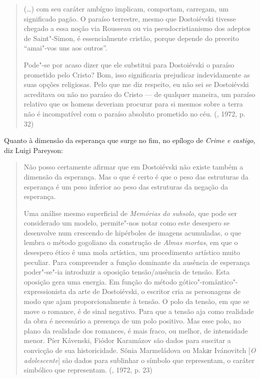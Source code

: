 \begin{quote}
(\ldots{}) com seu caráter ambíguo implicam, comportam, carregam, um
significado pagão. O paraíso terrestre, mesmo que Dostoiévski tivesse
chegado a essa noção via Rousseau ou via pseudocristianismo dos adeptos
de Saint"-Simon, é essencialmente cristão, porque depende do preceito
``amai"-vos uns aos outros''.

Pode"-se por acaso dizer que ele substitui para Dostoiévski o paraíso
prometido pelo Cristo? Bom, isso significaria prejudicar indevidamente
as suas opções religiosas. Pelo que me diz respeito, eu não sei se
Dostoiévski acreditava ou não no paraíso do Cristo --- de qualquer
maneira, um paraíso relativo que os homens deveriam procurar para si
mesmos sobre a terra não é incompatível com o paraíso absoluto prometido
no céu. (, 1972, p. 32)
\end{quote}

Quanto à dimensão da esperança que surge no fim, no epílogo de
\emph{Crime e castigo}, diz Luigi Pareyson:

\begin{quote}
Não posso certamente afirmar que em Dostoiévski não existe também a
dimensão da esperança. Mas o que é certo é que o peso das estruturas da
esperança é um peso inferior ao peso das estruturas da negação da
esperança.

Uma análise mesmo superficial de \emph{Memórias do subsolo}, que pode
ser considerado um modelo, permite"-nos notar como este desespero se
desenvolve num crescendo de hipérboles de imagens acumuladas, o que
lembra o método gogoliano da construção de \emph{Almas mortas}, em que o
desespero ético é uma mola artística, um procedimento artístico muito
peculiar. Para compreender a função dominante da ausência de esperança
poder"-se"-ia introduzir a oposição tensão/ausência de tensão. Esta
oposição gera uma energia. Em função do método
gótico"-romântico"-expressionista da arte de Dostoiévski, o escritor cria
as personagens de modo que ajam proporcionalmente à tensão. O polo da
tensão, em que se move o romance, é de sinal negativo. Para que a tensão
aja como realidade da obra é necessário a presença de um polo positivo.
Mas esse polo, no plano da realidade dos romances, é mais fraco, ou
melhor, de intensidade menor. Píer Kávenski, Fiódor Karamázov são dados
para suscitar a convicção de sua historicidade. Sônia Marmeládova ou
Makаr Ivánovitch [\emph{O adolescente}] são dados para sublinhar o
símbolo que representam, o caráter simbólico que representam. (, 1972, p. 23)
\end{quote}

